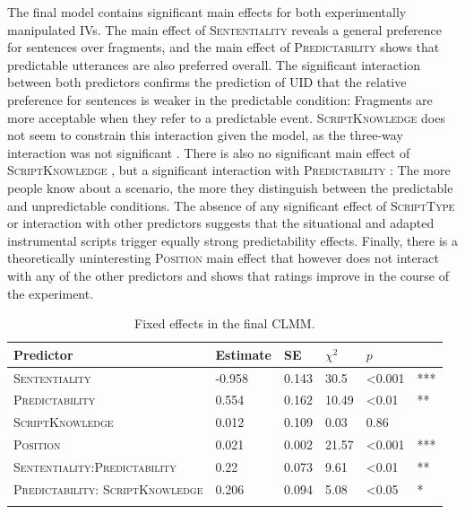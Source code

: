 The final model contains significant main effects for both experimentally manipulated IVs. The main effect of \textsc{Sententiality}  reveals a general preference for sentences over fragments, and the main effect of \textsc{Predictability}  shows that predictable utterances are also preferred overall. The significant interaction  between both predictors confirms the prediction of UID that the relative preference for sentences is weaker in the predictable condition: Fragments are more acceptable when they refer to a predictable event. \textsc{ScriptKnowledge} does not seem to constrain this interaction given the model, as the three-way interaction was not significant . There is also no significant main effect of \textsc{ScriptKnowledge} , but a significant interaction with \textsc{Predictability} : The more people know about a scenario, the more they distinguish between the predictable and unpredictable conditions. The absence of any significant effect of \textsc{ScriptType} or interaction with other predictors suggests that the situational and adapted instrumental scripts trigger equally strong predictability effects. Finally, there is a theoretically uninteresting \textsc{Position} main effect that however does not interact with any of the other predictors and shows that ratings improve in the course of the experiment.

\begin{table}[t]
\centering
\caption{Fixed effects in the final CLMM. \label{tab:scripts-rating-estimates}}
\begin{tabular}{p{3.4cm}lllll}
\lsptoprule
Predictor & Estimate & SE & $\chi^2$ &  $p$ &  \\   
\midrule
\textsc{Sententiality}      &  -0.958 & 0.143 & 30.5 & \textless 0.001 & ***\\
\textsc{Predictability}    &   \phantom{-}0.554 &  0.162 & 10.49 & \textless 0.01 & ** \\
\textsc{ScriptKnowledge}    &  \phantom{-}0.012 &  0.109 & \phantom{1}0.03 & \phantom{\textless }0.86  &  \\
\textsc{Position}   & \phantom{-}0.021 & 0.002 & 21.57 & \textless 0.001 & *** \\
\textsc{Sententiality:}\linebreak \textsc{Predictability} &   \phantom{-}0.22 &  0.073  & \phantom{-}9.61 & \textless 0.01 & **\\
\textsc{Predictability:} \textsc{ScriptKnowledge}   &  \phantom{-}0.206 & 0.094 & \phantom{1}5.08  & \textless 0.05 & *\\
\lspbottomrule
\end{tabular}
\end{table}


